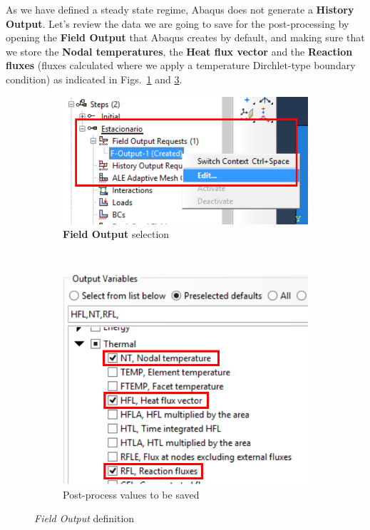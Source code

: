   As we have defined a steady state regime, Abaqus does not generate a
  \textbf{History Output}. Let's review the data we are going to save
  for the post-processing by opening the \textbf{Field Output} that
  Abaqus creates by default, and making sure that we store
  the \textbf{Nodal temperatures}, the \textbf{Heat flux vector} and
  the \textbf{Reaction fluxes} (fluxes calculated where we apply a temperature
  Dirchlet-type boundary condition) as indicated in Figs.~\ref{step04}
  and \ref{step05}.
  \begin{figure}[!h]
    \centering
    \begin{subfigure}[!h]{0.45\textwidth}
      \includegraphics[width=\textwidth]{./body/images/step04.pdf}
      \caption{\textbf{Field Output} selection}
      \label{step04}
    \end{subfigure}%
    ~ %
    \begin{subfigure}[!h]{0.45\textwidth}
      \includegraphics[width=\textwidth]{./body/images/step05.pdf}
      \caption{Post-process values to be saved}
      \label{step05}
    \end{subfigure}%
    \caption{\textit{Field Output} definition}
  \end{figure}


